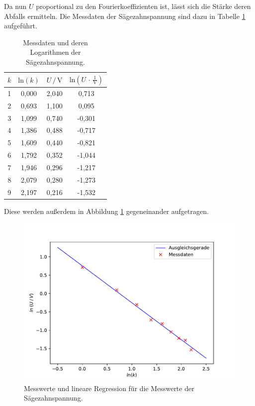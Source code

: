 Da nun $U$ proportional zu den Fourierkoeffizienten ist, lässt sich die
Stärke deren Abfalls ermitteln.
Die Messdaten der Sägezahnspannung sind dazu in Tabelle \ref{tab:Messdaten1} aufgeführt. 

\begin{table}[H]
    \centering
    \caption{Messdaten und deren Logarithmen der Sägezahnspannung.}
    \label{tab:Messdaten1}
    \begin{tabular}{c c c c}
    \toprule
    $k$ & $\text{ln} (k)$ & $U \,/\, \si{\volt}$ & $\text{ln}(U \,\cdot\, \frac{1}{\si{\volt}})$ \\
    \midrule
    1 & 0,000 & 2,040 &  0,713 \\
    2 & 0,693 & 1,100 &  0,095 \\
    3 & 1,099 & 0,740 & -0,301 \\
    4 & 1,386 & 0,488 & -0,717 \\
    5 & 1,609 & 0,440 & -0,821 \\
    6 & 1,792 & 0,352 & -1,044 \\
    7 & 1,946 & 0,296 & -1,217 \\
    8 & 2,079 & 0,280 & -1,273 \\
    9 & 2,197 & 0,216 & -1,532 \\
    \bottomrule
    \end{tabular}
\end{table} 

Diese werden außerdem in Abbildung \ref{fig:Säge} gegeneinander aufgetragen.

\begin{figure}[H]
    \centering
    \includegraphics[scale=0.9]{content/plot1.pdf}
    \caption{Messwerte und lineare Regression für die Messwerte der Sägezahnspannung.}
    \label{fig:Säge}
\end{figure}

